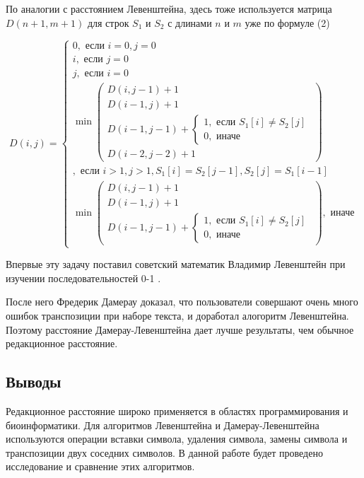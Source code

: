 По аналогии с расстоянием Левенштейна, здесь тоже используется матрица
$D(n+1, m+1)$ для строк $S_1$ и $S_2$ с длинами $n$ и $m$ уже по формуле (2)
\cite{bmstu}

\begin{equation}
D(i,j) =
\begin{cases}
    0, \text{ если } i = 0, j = 0 \\
    i, \text{ если } j = 0 \\
    j, \text{ если } i = 0 \\

    \min
    \left(
        \begin{matrix}
            D(i, j - 1) + 1 \\
            D(i - 1, j) + 1 \\
            D(i - 1, j - 1) +
            \begin{cases}
                1, \text{ если } S_1[i] \ne S_2[j] \\
                0, \text{ иначе}
            \end{cases} \\
            D(i - 2, j - 2) + 1
        \end{matrix}
    \right) \\
    , \text{ если } i > 1, j > 1, S_1[i] = S_2[j - 1], S_2[j] = S_1[i - 1] \\

    \min
    \left(
    \begin{matrix}
        D(i, j - 1) + 1 \\
        D(i - 1, j) + 1 \\
        D(i - 1, j - 1) +
        \begin{cases}
            1, \text{ если } S_1[i] \ne S_2[j] \\
            0, \text{ иначе}
        \end{cases}
    \end{matrix}
    \right)
    , \text{ иначе}
\end{cases}
\end{equation}

Впервые эту задачу поставил советский математик Владимир Левенштейн при
изучении последовательностей 0-1 \cite{binlev}.

После него Фредерик Дамерау доказал, что пользователи совершают очень много
ошибок транспозиции при наборе текста, и доработал алогоритм Левенштейна.
Поэтому расстояние Дамерау-Левенштейна дает лучше результаты, чем
обычное редакционное расстояние.

\subsection{Выводы}

Редакционное расстояние широко применяется в областях программирования и
биоинформатики. Для алгоритмов Левенштейна и Дамерау-Левенштейна
используются операции вставки символа, удаления символа, замены символа и
транспозиции двух соседних символов. В данной работе будет проведено
исследование и сравнение этих алгоритмов.
